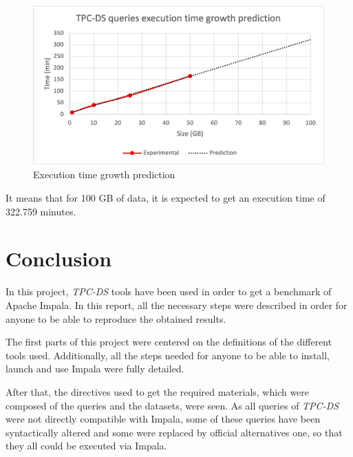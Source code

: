 \documentclass{article}
\newcommand\bld[1]{\textbf{#1}}
\newcommand\ita[1]{\textit{#1}}
\begin{document}
\begin{figure}[H] 
\begin{center}
\includegraphics[width=15cm]{images/image.png}
\end{center}
\caption{Execution time growth prediction}
\label{ExecutionTimeGrowthPrediction}
\end{figure}

It means that for 100 GB of data, it is expected to get an execution time of 322.759 minutes.





\section{Conclusion}
In this project, \ita{TPC-DS} tools have been used in order to get a benchmark of Apache Impala. In this report, all the necessary steps were described in order for anyone to be able to reproduce the obtained results.

The first parts of this project were centered on the definitions of the different tools used. Additionally, all the steps needed for anyone to be able to install, launch and use Impala were fully detailed.

After that, the directives used to get the required materials, which were composed of the queries and the datasets, were seen. As all queries of \ita{TPC-DS} were not directly compatible with Impala, some of these queries have been syntactically altered and some were replaced by official alternatives one, so that they all could be executed via Impala.
\end{document}
